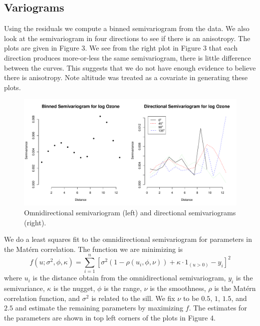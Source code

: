 \documentclass[12pt]{article}
\begin{document}
\newpage

\subsection*{Variograms}

Using the residuals we compute a binned semivariogram from the data. We also look at the semivariogram in four directions to see if there is an anisotropy. The plots are given in Figure 3. We see from the right plot in Figure 3 that each direction produces more-or-less the same semivariogram, there is little difference between the curves. This suggests that we do not have enough evidence to believe there is anisotropy. Note altitude was treated as a covariate in generating these plots.

\begin{figure}[ht]
\begin{center}
\includegraphics[scale=0.5]{figs/variogram.pdf}
\end{center}
\caption{Omnidirectional semivariogram (left) and directional semivariograms (right).}
\end{figure}

We do a least squares fit to the omnidirectional semivariogram for parameters in the Mat{\'e}rn correlation. The function we are minimizing is
\[ f(u; \sigma^2,\phi,\kappa) = \sum_{i=1}^n\left[\sigma^2 (1 - \rho(u_i, \phi, \nu)) + \kappa\cdot 1_{(u>0)} - y_i\right]^2 \]
where $u_i$ is the distance obtain from the omnidirectional semivariogram, $y_i$ is the semivariance, $\kappa$ is the nugget, $\phi$ is the range, $\nu$ is the smoothness, $\rho$ is the Mat{\'e}rn correlation function, and $\sigma^2$ is related to the sill. We fix $\nu$ to be $0.5$, $1$, $1.5$, and $2.5$ and estimate the remaining parameters by maximizing $f$. The estimates for the parameters are shown in top left corners of the plots in Figure 4.
\end{document}
